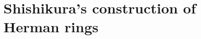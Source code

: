 \documentclass[12pt]{article}
\begin{document}







\section{Shishikura's construction of Herman rings}\label{quasi}
\end{document}
